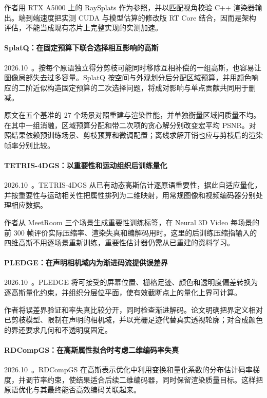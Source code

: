作者用 RTX A5000 上的 RaySplats 作为参照，并以匹配视角校验 C++ 渲染器输出。端到端速度把实测 CUDA 与模型估算的修改版 RT Core 结合，因而是架构评估，不能当成现有芯片上完整实现的实测加速。

\paragraph{SplatQ：在固定预算下联合选择相互影响的高斯}
2026.10~\cite{2610_13503}。按每个原语独立得分剪枝可能同时移除互相补偿的一组高斯，也容易让图像局部失去过多容量。SplatQ 按空间与外观划分后分配区域预算，并用颜色响应的二阶近似构造固定预算的二次选择问题，将成对影响与单点贡献共同用于删减。

原文在五个基准的 27 个场景对照重建与渲染性能，并单独衡量区域间质量不均。在其中一组消融，区域预算分配和带二次项的贪心解分别改变宏平均 PSNR。对照结果依赖预训练场景、剪枝预算和微调配置；离线求解开销也应与剪枝后的渲染帧率分别比较。

\paragraph{TETRIS-4DGS：以重要性和运动组织后训练量化}
2026.10~\cite{2610_14663}。TETRIS-4DGS 从已有动态高斯估计逐原语重要性，据此自适应量化，并按重要性与运动相关性把属性排列为二维映射，用常规图像和视频编码器分别处理相应数据。

作者从 MeetRoom 三个场景生成重要性训练标签，在 Neural 3D Video 每场景的前 300 帧评价实际压缩率、渲染失真和编解码用时。这里的后训练压缩指输入的四维高斯不用逐场景重新训练，重要性估计器仍需从已重建的资料学习。

\paragraph{PLEDGE：在声明相机域内为渐进码流提供误差界}
2026.10~\cite{2610_17605}。PLEDGE 将可接受的屏幕位置、栅格足迹、颜色和透明度偏差转换为逐高斯量化约束，并组织分层位平面，使有效截断点上的量化上界可计算。

作者将误差界验证和率失真比较分开，同时检查渐进解码。论文明确把界定义相对已剪枝模型、限制在声明的相机域，并以光栅足迹代替真实透视轮廓；对合成颜色的界还要求几何和不透明度固定。

\paragraph{RDCompGS：在高斯属性拟合时考虑二维编码率失真}
2026.10~\cite{2610_19538}。RDCompGS 在高斯表示优化中利用变换和量化系数的分布估计码率梯度，并调节率约束，使结果适合后续二维编码器，同时保留渲染质量目标。这样把原语优化与其最终能否高效编码关联起来。

